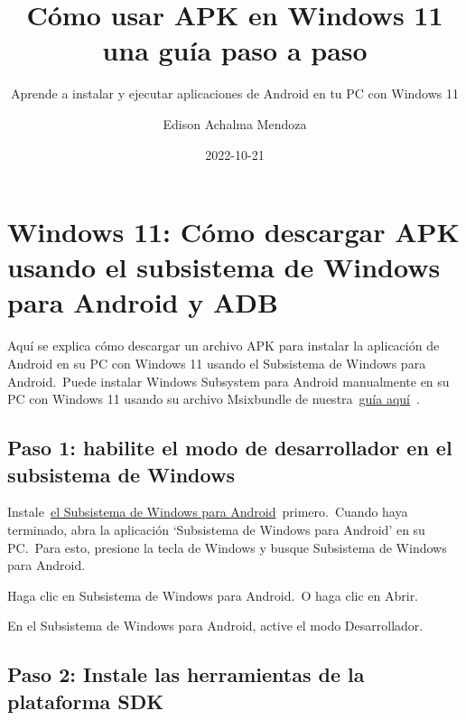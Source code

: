 \documentclass[
  letterpaper,
  DIV=11,
  numbers=noendperiod]{scrartcl}
\title{Cómo usar APK en Windows 11 una guía paso a paso}
\subtitle{Aprende a instalar y ejecutar aplicaciones de Android en tu PC
con Windows 11}
\author{Edison Achalma Mendoza}
\date{2022-10-21}
\begin{document}
\maketitle
\ifdefined\Shaded\renewenvironment{Shaded}{\begin{tcolorbox}[sharp corners, breakable, boxrule=0pt, borderline west={3pt}{0pt}{shadecolor}, enhanced, interior hidden, frame hidden]}{\end{tcolorbox}}\fi

\hypertarget{windows-11-cuxf3mo-descargar-apk-usando-el-subsistema-de-windows-para-android-y-adb}{%
\section{Windows 11: Cómo descargar APK usando el subsistema de Windows
para Android y
ADB}\label{windows-11-cuxf3mo-descargar-apk-usando-el-subsistema-de-windows-para-android-y-adb}}

Aquí se explica cómo descargar un archivo APK para instalar la
aplicación de Android en su PC con Windows 11 usando el Subsistema de
Windows para Android.~Puede instalar Windows Subsystem para Android
manualmente en su PC con Windows 11 usando su archivo Msixbundle de
nuestra~\href{https://nerdschalk.com/android-apps-on-windows-11-dev-channel-how-to-install-windows-subsystem-for-android-manually-with-msixbundle/}{guía
aquí}~.

\hypertarget{paso-1-habilite-el-modo-de-desarrollador-en-el-subsistema-de-windows}{%
\subsection{Paso 1: habilite el modo de desarrollador en el subsistema
de
Windows}\label{paso-1-habilite-el-modo-de-desarrollador-en-el-subsistema-de-windows}}

Instale~\href{https://nerdschalk.com/android-apps-on-windows-11-dev-channel-how-to-install-windows-subsystem-for-android-manually-with-msixbundle/}{el
Subsistema de Windows para Android}~primero.~Cuando haya terminado, abra
la aplicación `Subsistema de Windows para Android' en su PC.~Para esto,
presione la tecla de Windows y busque Subsistema de Windows para
Android.

Haga clic en Subsistema de Windows para Android.~O haga clic en Abrir.

En el Subsistema de Windows para Android, active el modo Desarrollador.

\hypertarget{paso-2-instale-las-herramientas-de-la-plataforma-sdk}{%
\subsection{Paso 2: Instale las herramientas de la plataforma
SDK}\label{paso-2-instale-las-herramientas-de-la-plataforma-sdk}}
\end{document}

